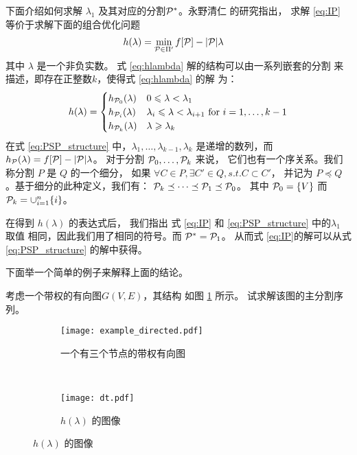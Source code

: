 下面介绍如何求解 $\lambda_1$ 及其对应的分割$\P^*$。永野清仁 \cite{mac} 的研究指出，
求解 \eqref{eq:IP} 等价于求解下面的组合优化问题
\begin{align}\label{eq:hlambda}
  h(\lambda) &= \min_{\P \in \Pi'} f[\P] - \abs{\P} \lambda 
  \end{align}
其中 $\lambda$ 是一个非负实数。
式 \eqref{eq:hlambda} 解的结构可以由一系列嵌套的分割
来描述，即存在正整数$k$，使得式 \eqref{eq:hlambda} 的解
为：
\begin{equation}\label{eq:PSP_structure}
  h(\lambda) = \begin{cases} h_{\P_0}(\lambda) & 0\leq \lambda < \lambda_1 \\
  h_{\P_i}(\lambda) & \lambda_i \leq \lambda < \lambda_{i+1} \textrm{ for } i = 1, \dots, k-1 \\
  h_{\P_k}(\lambda) & \lambda \geq \lambda_k
  \end{cases}
\end{equation}
在式 \eqref{eq:PSP_structure} 中，$\lambda_1, \dots, \lambda_{k-1},
\lambda_k$ 是递增的数列，而 $h_{\P}(\lambda)=f[\P]-|\P|\lambda$。
对于分割 $\P_0, \dots, \P_k$ 来说，
它们也有一个序关系。我们称分割 $P$ 是 $Q$ 的一个细分，
如果 $\forall C \in P, \exists C' \in Q, s.t. C\subset C'$，
并记为 $P \preceq Q$。基于细分的此种定义，我们有：
$\P_k \preceq \dots \preceq \P_1 \preceq \P_0$。
其中 $\P_0=\{V\}$ 而 $\P_k=\cup_{i=1}^n \{ i\}$。

在得到 $h(\lambda)$ 的表达式后，
我们指出 式 \eqref{eq:IP} 和
\eqref{eq:PSP_structure} 中的$\lambda_1$ 取值
相同，因此我们用了相同的符号。而 $\P^*=\P_1$。
从而式 \eqref{eq:IP}的解可以从式 \eqref{eq:PSP_structure}
的解中获得。

下面举一个简单的例子来解释上面的结论。
\begin{example}\label{ex:psp}
考虑一个带权的有向图$G(V,E)$，其结构
如图 \ref{fig:example_directed} 所示。
试求解该图的主分割序列。
\end{example}
\begin{figure}
  \centering
  \begin{subfigure}[b]{0.5\linewidth}
  \texttt{[image: example\_directed.pdf]}
  \caption{一个有三个节点的带权有向图}
  \label{fig:example_directed}
  \end{subfigure}~
  \begin{subfigure}[b]{0.5\linewidth}
    \texttt{[image: dt.pdf]}
    \caption{$h(\lambda)$ 的图像}
    \label{fig:dt}
    \end{subfigure}  
\end{figure}

